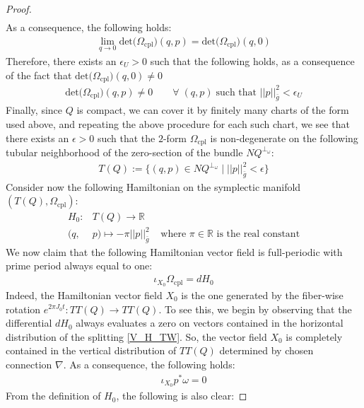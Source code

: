 \documentclass[11pt]{amsart}
\theoremstyle{plain}
\theoremstyle{definition}
\theoremstyle{remark}
\begin{document}
\begin{proof}
\begin{align}
\end{align}
As a consequence, the following holds:
\begin{align}
    \lim_{q\rightarrow 0} \text{det}\big(\Omega_{\text{cpl}}\big)(q,p) = \text{det}\big(\Omega_{\text{cpl}}\big)(q,0)
\end{align}
Therefore, there exists an $\epsilon_U>0$ such that the following holds, as a consequence of the fact that $\text{det}\big(\Omega_{\text{cpl}}\big)(q,0) \neq 0$
\begin{align}
    \text{det}\big(\Omega_{\text{cpl}}\big)(q,p) \neq 0 \qquad \forall\; (q,p) \; \text{such that } \vert\vert p\vert\vert_{\bar g}^2 < \epsilon_U
\end{align}
Finally, since $Q$ is compact, we can cover it by finitely many charts of the form used above, and repeating the above procedure for each such chart, we see that there exists an $\epsilon>0$ such that the $2$-form $\Omega_{\text{cpl}}$ is non-degenerate on the following tubular neighborhood of the zero-section of the bundle $NQ^{\perp_{\omega}}$:
\begin{align}
    T(Q):=\big\{(q,p)\in NQ^{\perp_{\omega}}\; \vert \; \vert\vert p\vert\vert^2_{\bar g} < \epsilon \big\}
\end{align}
Consider now the following Hamiltonian on the symplectic manifold $(T(Q),\Omega_{\text{cpl}})$:
\begin{align}
    H_0: &T(Q) \longrightarrow \mathbb{R}\\\nonumber
    (q,&p)\mapsto -\pi \vert\vert p \vert\vert_{\bar g}^2 \;\;\;\; \text{where $\pi \in \mathbb{R}$ is the real constant} 
\end{align}
We now claim that the following Hamiltonian vector field is full-periodic with prime period always equal to one:
\begin{align}
    \iota_{X_0}\Omega_{\text{cpl}} =  dH_0
\end{align}
Indeed, the Hamiltonian vector field $X_0$ is the one generated by the fiber-wise rotation $e^{2\pi J_0t}:TT(Q) \rightarrow TT(Q)$. To see this, we begin by observing that the differential $dH_0$ always evaluates a zero on vectors contained in the horizontal distribution of the splitting \eqref{V_H_TW}. So, the vector field $X_0$ is completely contained in the vertical distribution of $TT(Q)$ determined by chosen connection $\nabla$. As a consequence, the following holds:
\begin{align}
    \iota_{X_0}p^*\omega=0
\end{align}
From the definition of $H_0$, the following is also clear:

\end{proof}
\end{document}
